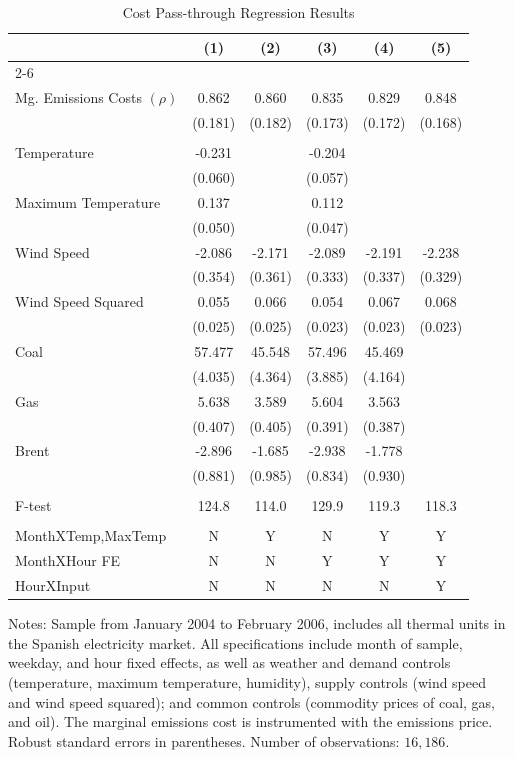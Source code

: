 \begin{table}
\centering
\caption{Cost Pass-through Regression Results} \label{tab:cost_pt}

\begin{tabular*}{.9\textwidth}{@{\extracolsep{\fill}} l  c  c  c  c  c }
\hline\hline 
 & \textbf{(1)}  & \textbf{(2)}  & \textbf{(3)}  & \textbf{(4)}  & \textbf{(5)} \\ \cline{2-6} \\[-\sep]
Mg. Emissions Costs $(\rho)$  & 0.862 & 0.860 & 0.835 & 0.829 & 0.848 \\ 
 & (0.181) & (0.182) & (0.173) & (0.172) & (0.168) \\[\sep] \hline \\[-\sep]
Temperature  & -0.231 & & -0.204 & & \\ 
 & (0.060) & & (0.057) & & \\[\sep] 
Maximum Temperature  & 0.137 & & 0.112 & & \\ 
 & (0.050) & & (0.047) & & \\[\sep] 
Wind Speed  & -2.086 & -2.171 & -2.089 & -2.191 & -2.238 \\ 
 & (0.354) & (0.361) & (0.333) & (0.337) & (0.329) \\[\sep] 
Wind Speed Squared & 0.055 & 0.066 & 0.054 & 0.067 & 0.068 \\ 
 & (0.025) & (0.025) & (0.023) & (0.023) & (0.023) \\[\sep] 
Coal  & 57.477 & 45.548 & 57.496 & 45.469 \\ 
 & (4.035) & (4.364) & (3.885) & (4.164) \\[\sep] 
Gas  & 5.638 & 3.589 & 5.604 & 3.563 \\ 
 & (0.407) & (0.405) & (0.391) & (0.387) \\[\sep] 
Brent  & -2.896 & -1.685 & -2.938 & -1.778 \\ 
 & (0.881) & (0.985) & (0.834) & (0.930) \\[\sep]\hline\\[-\sep]
 F-test 
 & 124.8  & 114.0  & 129.9  & 119.3  & 118.3  \\[\sep]\hline\\[-\sep]
MonthXTemp,MaxTemp     & N & Y & N & Y & Y  \\
MonthXHour FE          & N & N & Y & Y & Y  \\
HourXInput                     & N & N & N & N & Y  \\[\sep]
\hline\hline 
\end{tabular*}
\begin{minipage}[c]{.9\textwidth}
{\footnotesize 
\noindent
Notes: Sample from January 2004 to February 2006, includes all thermal units in the Spanish electricity market. 
All specifications include month of sample, weekday, and hour fixed effects, as well as weather and demand controls 
(temperature, maximum temperature, humidity), 
 supply controls (wind speed and wind speed squared); and common controls (commodity prices of 
coal, gas, and oil). The marginal emissions cost is instrumented with the emissions price. 
Robust standard errors in parentheses. Number of observations: $ 16,186$.}
\end{minipage}
\end{table}
